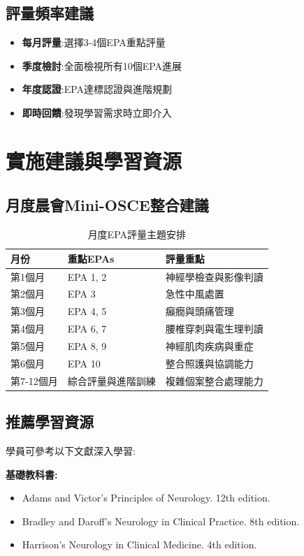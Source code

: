 \documentclass[12pt,a4paper]{article}
\begin{document}
\subsection{評量頻率建議}
\begin{itemize}[nosep]
    \item \textbf{每月評量}:選擇3-4個EPA重點評量
    \item \textbf{季度檢討}:全面檢視所有10個EPA進展
    \item \textbf{年度認證}:EPA達標認證與進階規劃
    \item \textbf{即時回饋}:發現學習需求時立即介入
\end{itemize}

\section{實施建議與學習資源}

\subsection{月度晨會Mini-OSCE整合建議}
\begin{table}[h]
    \centering
    \caption{月度EPA評量主題安排}
    \begin{tabular}{p{2.5cm} p{4.5cm} p{7cm}}
        \toprule
        \textbf{月份} & \textbf{重點EPAs} & \textbf{評量重點} \\
        \midrule
        第1個月 & EPA 1, 2 & 神經學檢查與影像判讀 \\
        第2個月 & EPA 3 & 急性中風處置 \\
        第3個月 & EPA 4, 5 & 癲癇與頭痛管理 \\
        第4個月 & EPA 6, 7 & 腰椎穿刺與電生理判讀 \\
        第5個月 & EPA 8, 9 & 神經肌肉疾病與重症 \\
        第6個月 & EPA 10 & 整合照護與協調能力 \\
        第7-12個月 & 綜合評量與進階訓練 & 複雜個案整合處理能力 \\
        \bottomrule
    \end{tabular}
\end{table}

\subsection{推薦學習資源}
學員可參考以下文獻深入學習:

\textbf{基礎教科書:}
\begin{itemize}
    \item Adams and Victor's Principles of Neurology. 12th edition.
    \item Bradley and Daroff's Neurology in Clinical Practice. 8th edition.
    \item Harrison's Neurology in Clinical Medicine. 4th edition.
\end{itemize}
\end{document}
